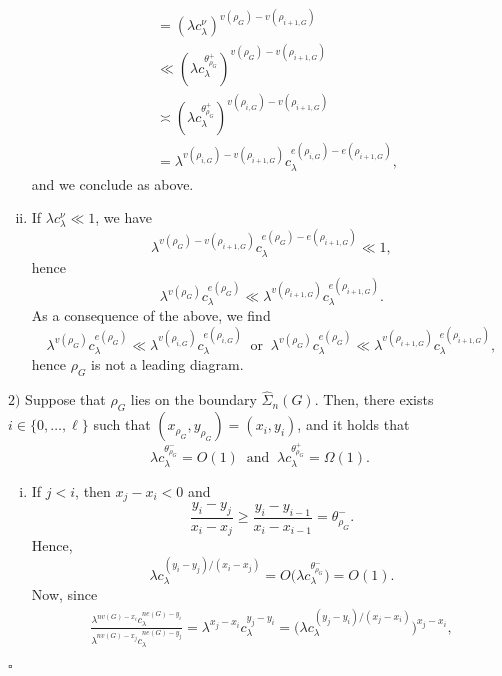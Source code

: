 \documentclass[12pt]{article}
\newenvironment{Proof}{\removelastskip\par\medskip
\noindent{\em Proof.} \rm}{\penalty-20\null\hfill$\square$\par\medbreak}
\numberwithin{equation}{section}
\begin{document}
\begin{Proof}
\begin{enumerate}[i)]
\begin{align*}
  & =  \left(\lambda c_\lambda^\nu\right)^{v({\rho_G})-v(\rho_{i+1,G})}
  \\
  & \ll \left(\lambda c_\lambda^{\theta^+_{\rho_G}} \right)^{v({\rho_G})-v(\rho_{i+1,G})}
  \\
   &  \asymp \left(\lambda c_\lambda^{\theta^+_{\rho_G}}\right)^{v(\rho_{i,G})-v(\rho_{i+1,G})}
  \\
   & =  \lambda^{v(\rho_{i,G})-v(\rho_{i+1,G})}c_\lambda^{e(\rho_{i,G})-e(\rho_{i+1,G})}, 
\end{align*}
\noindent
 and we conclude as above. 
\item  If
 $\lambda c_\lambda^\nu\ll 1$, we have
 \begin{equation*}
\lambda^{v({\rho_G})-v(\rho_{i+1,G})}c_\lambda^{e({\rho_G})-e(\rho_{i+1,G})}\ll1, 
\end{equation*}
 hence
 $$\lambda^{v({\rho_G})}c_\lambda^{e({\rho_G})}\ll \lambda^{v(\rho_{i+1,G})}c_\lambda^{e(\rho_{i+1,G})}.
 $$
\noindent 
 As a consequence of the above, we find  
\begin{equation}
\nonumber
\lambda^{v({\rho_G})}c_\lambda^{e({\rho_G})}
\ll
\lambda^{v(\rho_{i,G})}c_\lambda^{e(\rho_{i,G})}
  \ \mbox{ or } \ 
\lambda^{v({\rho_G})}c_\lambda^{e({\rho_G})}
\ll
\lambda^{v(\rho_{i+1,G})}c_\lambda^{e(\rho_{i+1,G})}, 
\end{equation}
 hence ${\rho_G}$ is not a leading diagram. 
\end{enumerate} 
\noindent
$2)$ Suppose that $\rho_{G}$ lies on the boundary $\widehat{\Sigma}_{n}(G)$.
Then, there exists $i\in \{0,\dots,\ell\}$
 such that $(x_{\rho_{G}},y_{\rho_{G}})=(x_{i},y_{i})$, and it holds that
$$
\lambda c_\lambda^{ \theta^-_{\rho_G}}=O(1) \ \mbox{ and } \
  \lambda c_\lambda^{ \theta^+_{\rho_G} }=\Omega(1). 
$$
  \begin{enumerate}[i)] 
  \item
    If $j<i$, then $x_{j}-x_{i}<0$ and
  $$
  \frac{y_{i}-y_{j}}{x_{i}-x_{j}}\ge\frac{y_{i}-y_{i-1}}{x_{i}-x_{i-1}}=\theta_{\rho_{G}}^{-}.
  $$
  Hence, 
\begin{equation}
  \lambda c_{\lambda}^{(y_{i}-y_{j})/(x_{i}-x_{j})}=O\big(\lambda c_\lambda^{ \theta^-_{\rho_G}}
  \big)=O(1).
\end{equation}
Now, since
\begin{eqnarray}
  \label{fjkl4}
  \frac{\lambda^{nv(G)-x_{i}}c_{\lambda}^{ne(G)-y_{i}}}{\lambda^{nv(G)-x_{j}}c_{\lambda}^{ne(G)-y_{j}}}=\lambda^{x_{j}-x_{i}}c_{\lambda}^{y_{j}-y_{i}}=\big(\lambda c_{\lambda}^{
    (y_{j}-y_{i})/(x_{j}-x_{i})}\big)^{x_{j}-x_{i}}, 

\end{eqnarray}
\end{enumerate}
\end{Proof}
\end{document}
